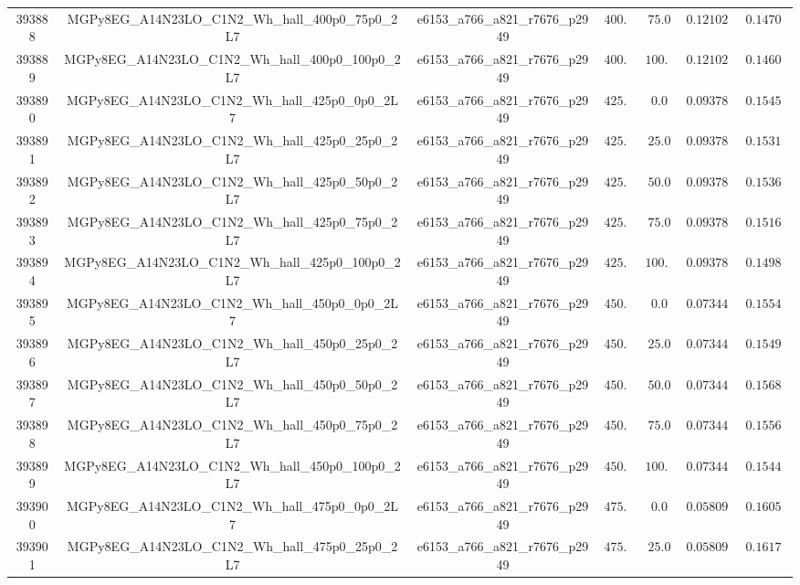\begin{table}[htbp]
\begin{center}
{\begin{tabular}{ccccccc}
393888 & MGPy8EG\_A14N23LO\_C1N2\_Wh\_hall\_400p0\_75p0\_2L7  & e6153\_a766\_a821\_r7676\_p2949 & $400.0$ & $75.0 $ & $0.121027  $ & $0.14707$ \\
393889 & MGPy8EG\_A14N23LO\_C1N2\_Wh\_hall\_400p0\_100p0\_2L7 & e6153\_a766\_a821\_r7676\_p2949 & $400.0$ & $100.0$ & $0.121027  $ & $0.14600$ \\
393890 & MGPy8EG\_A14N23LO\_C1N2\_Wh\_hall\_425p0\_0p0\_2L7   & e6153\_a766\_a821\_r7676\_p2949 & $425.0$ & $0.0  $ & $0.093788  $ & $0.15456$ \\
393891 & MGPy8EG\_A14N23LO\_C1N2\_Wh\_hall\_425p0\_25p0\_2L7  & e6153\_a766\_a821\_r7676\_p2949 & $425.0$ & $25.0 $ & $0.093788  $ & $0.15310$ \\
393892 & MGPy8EG\_A14N23LO\_C1N2\_Wh\_hall\_425p0\_50p0\_2L7  & e6153\_a766\_a821\_r7676\_p2949 & $425.0$ & $50.0 $ & $0.093788  $ & $0.15361$ \\
393893 & MGPy8EG\_A14N23LO\_C1N2\_Wh\_hall\_425p0\_75p0\_2L7  & e6153\_a766\_a821\_r7676\_p2949 & $425.0$ & $75.0 $ & $0.093788  $ & $0.15161$ \\
393894 & MGPy8EG\_A14N23LO\_C1N2\_Wh\_hall\_425p0\_100p0\_2L7 & e6153\_a766\_a821\_r7676\_p2949 & $425.0$ & $100.0$ & $0.093788  $ & $0.14988$ \\
393895 & MGPy8EG\_A14N23LO\_C1N2\_Wh\_hall\_450p0\_0p0\_2L7   & e6153\_a766\_a821\_r7676\_p2949 & $450.0$ & $0.0  $ & $0.073446  $ & $0.15549$ \\
393896 & MGPy8EG\_A14N23LO\_C1N2\_Wh\_hall\_450p0\_25p0\_2L7  & e6153\_a766\_a821\_r7676\_p2949 & $450.0$ & $25.0 $ & $0.073446  $ & $0.15494$ \\
393897 & MGPy8EG\_A14N23LO\_C1N2\_Wh\_hall\_450p0\_50p0\_2L7  & e6153\_a766\_a821\_r7676\_p2949 & $450.0$ & $50.0 $ & $0.073446  $ & $0.15682$ \\
393898 & MGPy8EG\_A14N23LO\_C1N2\_Wh\_hall\_450p0\_75p0\_2L7  & e6153\_a766\_a821\_r7676\_p2949 & $450.0$ & $75.0 $ & $0.073446  $ & $0.15568$ \\
393899 & MGPy8EG\_A14N23LO\_C1N2\_Wh\_hall\_450p0\_100p0\_2L7 & e6153\_a766\_a821\_r7676\_p2949 & $450.0$ & $100.0$ & $0.073446  $ & $0.15442$ \\
393900 & MGPy8EG\_A14N23LO\_C1N2\_Wh\_hall\_475p0\_0p0\_2L7   & e6153\_a766\_a821\_r7676\_p2949 & $475.0$ & $0.0  $ & $0.058091  $ & $0.16055$ \\
393901 & MGPy8EG\_A14N23LO\_C1N2\_Wh\_hall\_475p0\_25p0\_2L7  & e6153\_a766\_a821\_r7676\_p2949 & $475.0$ & $25.0 $ & $0.058091  $ & $0.16178$ \\

\end{tabular}}
\end{center}
\end{table}
